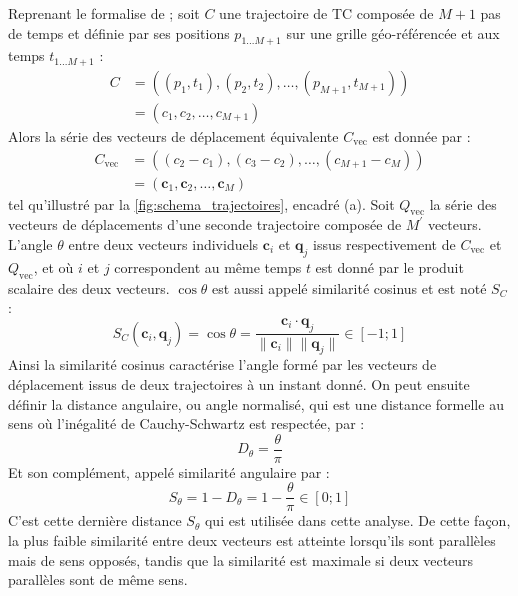 \documentclass[../main.tex]{subfiles}
\begin{document}
Reprenant le formalise de \cite{nakamura_shapebased_2013} ; soit $C$ une trajectoire de TC composée de $M+1$ pas de temps et définie par ses positions
$p_{1...M+1}$ sur une grille géo-référencée et aux temps $t_{1...M+1}$ :
%
\begin{align*}
    C &= ((p_1, t_1), (p_2, t_2), \ldots, (p_{M+1}, t_{M+1}))\\
      &= (c_1, c_2, \ldots, c_{M+1})
\end{align*}
%
Alors la série des vecteurs de déplacement équivalente $C_{\text{vec}}$ est donnée par :
\begin{align*}
    C_{\text{vec}} &= ((c_2 - c_1), (c_3 - c_2), \ldots, (c_{M+1} - c_M))\\
            &= (\mathbf{c}_1, \mathbf{c}_2, \ldots, \mathbf{c}_M)
\end{align*}
%
tel qu'illustré par la \cref{fig:schema_trajectoires}, encadré (a). Soit $Q_{\text{vec}}$ la série des vecteurs de déplacements d'une seconde trajectoire composée de
$M^\prime$ vecteurs. L'angle $\theta$ entre deux vecteurs individuels $\mathbf{c}_i$ et $\mathbf{q}_j$ issus respectivement de $C_{\text{vec}}$ et
$Q_{\text{vec}}$, et où $i$ et $j$ correspondent au même temps $t$ est donné par le produit scalaire des deux vecteurs. $\cos \theta$ est aussi appelé
similarité cosinus et est noté $S_C$ :
%
\begin{equation*}
    S_C(\mathbf{c}_i, \mathbf{q}_j) = \cos \theta = \frac{\mathbf{c}_i \cdot \mathbf{q}_j}{\lVert \mathbf{c}_i \rVert \lVert \mathbf{q}_j \rVert} \in [-1; 1] 
\end{equation*}
%
Ainsi la similarité cosinus caractérise l'angle formé par les vecteurs de déplacement issus de deux trajectoires à un instant donné. On peut ensuite définir la
distance angulaire, ou angle normalisé, qui est une distance formelle au sens où l'inégalité de Cauchy-Schwartz est respectée, par :
%
\begin{equation*}
    D_\theta = \frac{\theta}{\pi}
\end{equation*}
%
Et son complément, appelé similarité angulaire par :
%
\begin{equation*}
    S_\theta = 1 - D_\theta = 1 - \frac{\theta}{\pi} \in [0; 1]
\end{equation*}
%
C'est cette dernière distance $S_\theta$ qui est utilisée dans cette analyse. De cette façon, la plus faible similarité entre deux vecteurs est atteinte
lorsqu'ils sont parallèles mais de sens opposés, tandis que la similarité est maximale si deux vecteurs parallèles sont de même sens.
\end{document}

